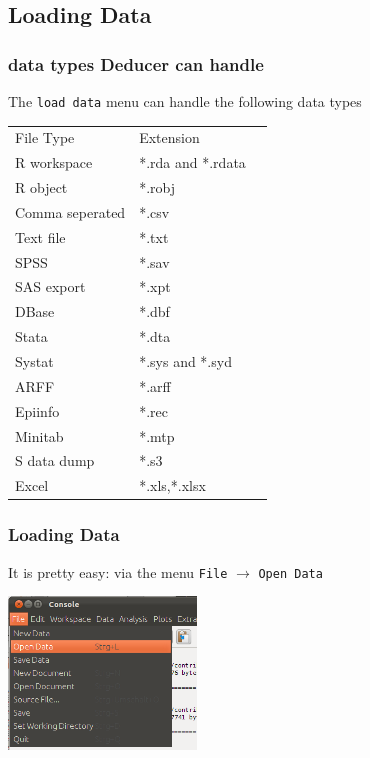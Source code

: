 \documentclass[xcolor={table},c]{beamer}
\begin{document}
\subsection{Loading Data}
\begin{frame}[shrink=5]\frametitle{data types Deducer can handle}
  The \texttt{load data} menu can handle the following data types
\begin{center}
  \begin{tabular}{@{} >{\ttfamily}l l l} 
    \rowcolor{gray!40}
    File Type&Extension\\
    R workspace&*.rda and *.rdata\\
    R object&*.robj\\
    Comma seperated&*.csv\\
    Text file&*.txt\\
    SPSS&*.sav\\
    SAS export&*.xpt\\
    DBase&*.dbf\\
    Stata&*.dta\\
    Systat&*.sys and *.syd\\
    ARFF&*.arff\\
    Epiinfo&*.rec\\
    Minitab&*.mtp\\
    S data dump&*.s3 \\
    Excel&*.xls,*.xlsx\\
  \end{tabular}
\end{center}
\end{frame}

\begin{frame}\frametitle{Loading Data}
  It is pretty easy: via the menu \texttt{File} $\to$ \texttt{Open Data}
  \begin{center}
    \includegraphics[width=5cm]{loaddata1.png} \hspace*{1cm}
  \end{center}
\end{frame}
\end{document}
